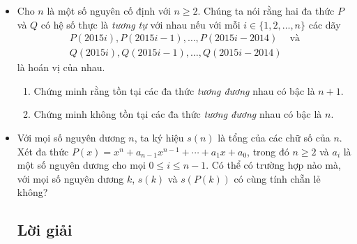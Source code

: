 \documentclass[11pt]{scrartcl}
\begin{document}
\begin{itemize}[label=, leftmargin=0em, itemsep=0.5em]
\begin{btvn}
        \end{btvn}
        \item \begin{btvn} Cho $n$ là một số nguyên cố định với $n \ge 2$. Chúng ta nói rằng hai đa thức $P$ và $Q$ có hệ số thực là \textit{tương tự} với nhau nếu với mỗi $i \in \{1, 2, \ldots, n\}$ các dãy
            \begin{eqnarray*}
                P(2015i), P(2015i - 1), \ldots, P(2015i - 2014) & \text{và}\\
                Q(2015i), Q(2015i - 1), \ldots, Q(2015i - 2014)
            \end{eqnarray*}
        là hoán vị của nhau.
        \begin{enumerate}[label=(\alph*)]
            \item Chứng minh rằng tồn tại các đa thức \textit{tương đương} nhau có bậc là $n + 1$.
            \item Chứng minh không tồn tại các đa thức \textit{tương đương} nhau có bậc là $n$.
        \end{enumerate}
        \end{btvn}
        \item \begin{btvn}
            Với mọi số nguyên dương \( n \), ta ký hiệu \( s(n) \) là tổng của các chữ số của \( n \). Xét đa thức \( P(x) = x^n + a_{n-1}x^{n-1} + \cdots + a_1x + a_0 \), trong đó \( n \geqslant 2 \) và \( a_i \) là một số nguyên dương cho mọi \( 0 \leqslant i \leqslant n-1 \). Có thể có trường hợp nào mà, với mọi số nguyên dương \( k \), \( s(k) \) và \( s(P(k)) \) có cùng tính chẵn lẻ không?

        \end{btvn}
        \subsection{\LARGE \textcolor{dk}{Lời giải}}
\end{itemize}
\end{document}
